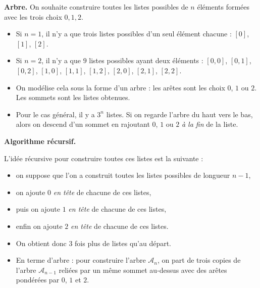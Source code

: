 \documentclass[11pt,class=report,crop=false]{standalone}
\begin{document}

\begin{cours}

\textbf{Arbre.}
On souhaite construire toutes les listes possibles de $n$ éléments formées avec les trois choix $0,1,2$.
\begin{itemize}
  \item Si $n=1$, il n'y a que trois listes possibles d'un seul élément chacune : $[0]$, $[1]$, $[2]$. 
   \item Si $n=2$, il n'y a que $9$ listes possibles ayant deux éléments : $[0, 0]$,  $[0, 1]$, $[0, 2]$, $[1, 0]$, $[1, 1]$, $[1, 2]$, $[2, 0]$, $[2, 1]$, $[2, 2]$. 
   \item On modélise cela sous la forme d'un arbre : les arêtes sont les choix $0$, $1$ ou $2$. Les sommets sont les listes obtenues.
   
\begin{minipage}{0.35\textwidth}   
\end{minipage}
\begin{minipage}{0.59\textwidth}  
\end{minipage}

\medskip

  \item Pour le cas général, il y a $3^n$ listes. Si on regarde l'arbre du haut vers le bas, alors on descend d'un sommet en rajoutant $0$, $1$ ou $2$ \emph{à la fin} de la liste.
   
\end{itemize}

\medskip


\textbf{Algorithme récursif.}

L'idée récursive pour construire toutes ces listes est la suivante :
\begin{itemize}
  \item on suppose que l'on a construit toutes les listes possibles de longueur $n-1$, 
  \item on ajoute $0$ \emph{en tête} de chacune de ces listes,
  \item puis on ajoute $1$ \emph{en tête} de chacune de ces listes,
  \item enfin on ajoute $2$  \emph{en tête} de chacune de ces listes.
  \item On obtient donc $3$ fois plus de listes qu'au départ.
  \item En terme d'arbre : pour construire l'arbre $\mathcal{A}_n$, on part de trois copies de l'arbre $\mathcal{A}_{n-1}$ reliées par un même sommet au-dessus avec des arêtes pondérées par $0$, $1$ et $2$.


\end{itemize}
\end{cours}
\end{document}
